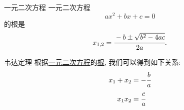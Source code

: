 \documentclass{ctexbeamer}
\begin{document}
\begin{frame}{一元二次方程}
  一元二次方程
  \label{eq}
  \[
    ax^2 + bx + c = 0
  \]
  的根是
  \label{sol}
  \[
    x_{1,2} = \cfrac{-b \pm \sqrt{b^2-4ac}}{2a}.
  \]
\end{frame}

\begin{frame}{韦达定理}
  根据\hyperlink{eq}{一元二次方程}的\hyperlink{sol}{根}, 我们可以得到如下关系:
  \begin{align*}
    x_1 + x_2 &= -\cfrac{b}{a}\\
    x_1x_2 &= \cfrac{c}{a}
  \end{align*}
\end{frame}
\end{document}
